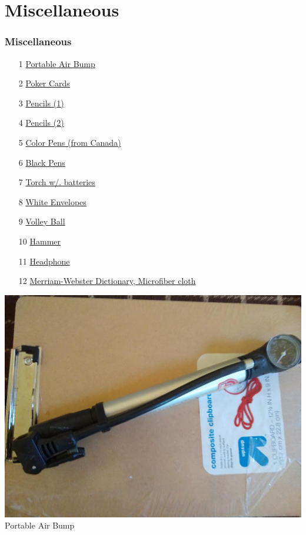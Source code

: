 \documentclass[t]{beamer}
\newcommand{\hlink}[2]{\hyperlink{#1}{#2}}
\newcommand{\htarget}[2]{\hypertarget{#1}{#2}}
\begin{document}
\section{Miscellaneous}

\begin{frame}[allowframebreaks]
\frametitle{Miscellaneous}
\begin{enumerate}
\item[1] \hlink{air}{Portable Air Bump}
\item[2] \hlink{poker}{Poker Cards}
\item[3] \hlink{pencil1}{Pencils (1)}
\item[4] \hlink{pencil2}{Pencils (2)}
\item[5] \hlink{colorpens}{Color Pens (from Canada)}
\item[6] \hlink{blackpens}{Black Pens}
\item[7] \hlink{torch}{Torch w/. batteries}
\item[8] \hlink{envelopes}{White Envelopes}
\item[9] \hlink{volleyball}{Volley Ball}
\item[10] \hlink{hammer}{Hammer}
\item[11] \hlink{headphone}{Headphone}
\item[12] \hlink{merriam}{Merriam-Webster Dictionary, Microfiber cloth}
\end{enumerate}
\end{frame}
\begin{frame}\htarget{air}{} \begin{center}
\includegraphics[height=0.8\textheight]{portable_air_bump_mini.jpg} \\
Portable Air Bump
\end{center} \end{frame}
\end{document}
